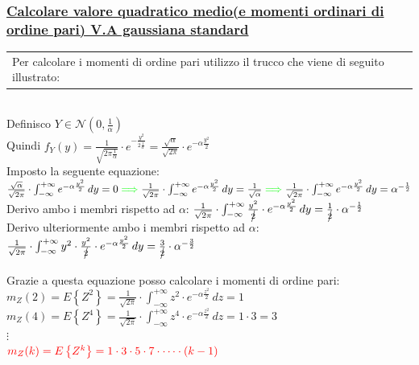 \documentclass{article}
\begin{document}
\subsubsection{\underline{Calcolare valore quadratico medio(e momenti ordinari di ordine pari) V.A gaussiana standard}}
\begin{tabular}{|p{13cm}}
Per calcolare i momenti di ordine pari utilizzo il trucco che viene di seguito illustrato:
\end{tabular} \\
Definisco $Y \in \mathcal{N} \left(0, \frac 1 \alpha \right)$ \\ 
Quindi $f_Y(y) = \frac{1}{\sqrt{2 \pi \frac{1}{\alpha}}} \cdot e^{-\frac{y^2}{2\frac{1}{\alpha}}} = \frac{\sqrt{\alpha}}{\sqrt{2 \pi}} \cdot e^{- \alpha \frac{y^2}{2}}$ \\
Imposto la seguente equazione: $\frac{\sqrt{\alpha}}{\sqrt{2\pi}} \cdot \int_{-\infty}^{+\infty} e^{- \alpha \frac{y^2}{2}} \,dy = 0 
{\color{green}\implies}
\frac{1}{\sqrt{2\pi}} \cdot \int_{-\infty}^{+\infty} e^{- \alpha \frac{y^2}{2}} \,dy = \frac{1}{\sqrt{\alpha}}
{\color{green}\implies}
\frac{1}{\sqrt{2\pi}} \cdot \int_{-\infty}^{+\infty} e^{- \alpha \frac{y^2}{2}} \,dy = \alpha^{-\frac 1 2 }$ \\
Derivo ambo i membri rispetto ad $\alpha$: $\frac{1}{\sqrt{2\pi}} \cdot \int_{-\infty}^{+\infty} \frac{y^2}{\cancel 2} \cdot  e^{- \alpha \frac{y^2}{2}} \,dy = \frac{1}{\cancel 2} \cdot \alpha^{-\frac 1 2 }$ \\
Derivo ulteriormente ambo i membri rispetto ad $\alpha$: $\frac{1}{\sqrt{2\pi}} \cdot \int_{-\infty}^{+\infty} y^2 \cdot \frac{y^2}{\cancel 2} \cdot  e^{- \alpha \frac{y^2}{2}} \,dy = \frac{3}{\cancel 2} \cdot \alpha^{-\frac 3 2 }$ \\ \\
Grazie a questa equazione posso calcolare i momenti di ordine pari: \\
$m_Z(2) = E \left\{Z^2\right\} = \frac{1}{\sqrt{2\pi}} \cdot \int_{-\infty}^{+\infty} z^2 \cdot  e^{- \alpha \frac{z^2}{2}} \,dz = 1$ \\
$m_Z(4) = E \left\{Z^4\right\} = \frac{1}{\sqrt{2\pi}} \cdot \int_{-\infty}^{+\infty} z^4 \cdot  e^{- \alpha \frac{z^2}{2}} \,dz = 1 \cdot 3 = 3$ \\
$\vdots$ \\
$\color{red} m_Z(k) = E \left\{ Z^k \right\} = 1 \cdot 3 \cdot 5 \cdot 7 \cdot \dots \cdot (k-1)$
\end{document}
